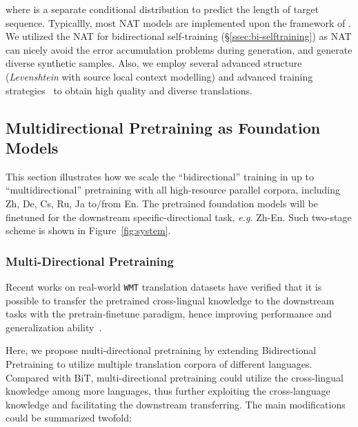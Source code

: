 \documentclass[11pt,a4paper]{article}
\newcommand{\zct}{\color{black}}
\begin{document}
where  is a separate conditional distribution to predict the length of target sequence. 
Typicallly, most NAT models are implemented upon the framework of .
We utilized {\zct the} NAT for {bidirectional self-training} (\S\ref{ssec:bi-selftraining}) as NAT can nicely avoid the error accumulation problems during generation, and generate diverse synthetic samples. 
Also, we employ several advanced structure~\cite{gu2019levenshtein,ding-etal-2020-context} (\textit{Levenshtein} with source local context modelling) and advanced training strategies~\cite{Ding2020Progressive,Ding2020Rejuvenating,Ding2020UnderstandingAI,ding2022redistributing,ding2022neural} to obtain high quality and diverse translations.

\subsection{Multidirectional Pretraining as Foundation Models}
\label{ssec:foundationmodel}

This section illustrates how we scale the ``bidirectional'' training in \citet{ding2021improving} up to ``multidirectional'' pretraining with all high-resource parallel corpora, including Zh, De, Cs, Ru, Ja to/from En. The pretrained foundation models will be {\zct finetuned for} the downstream specific-directional task, \textit{e.g.} Zh-En. Such two-stage scheme is shown in Figure~\ref{fig:system}.

\subsubsection{Multi-Directional Pretraining}
\label{ssec:multi-pt}
Recent works on real-world \texttt{WMT} translation datasets have verified that {\zct it is possible to transfer} the pretrained cross-lingual knowledge to the downstream tasks with {\zct the} pretrain-finetune paradigm, hence improving performance and generalization ability~\cite{ding2022redistributing, ding2022improving, wang-etal-2020-tencent}.

Here, we propose multi-directional pretraining by extending Bidirectional Pretraining \cite[BiT]{ding2021improving} to utilize multiple translation {\zct corpora} of different languages. Compared with BiT, multi-directional pretraining could utilize the cross-lingual knowledge among more languages, thus further exploiting the cross-language knowledge and facilitating the downstream transferring.
The main modifications could be summarized {\zct twofold}: 
\end{document}
